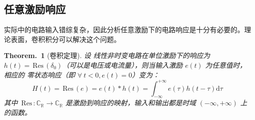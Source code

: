\documentclass[UTF8]{report}
\def\Res{\,\mathrm{Res}\,}
\def\R{\mathbb{R}}
\def\C{\mathbb{C}}
\theoremstyle{MyLineTheoremStyle} %
\theoremstyle{MyBlockTheoremStyle} %
\newtheorem{BlockTheorem}[LineTheorem]{Theorem.\,} %
\theoremstyle{MySubsubsectionStyle} %
\begin{document}
\subsection{任意激励响应}
实际中的电路输入错综复杂，因此分析任意激励下的电路响应是十分有必要的。理论表面，卷积积分可以解决这个问题。

\begin{BlockTheorem}[卷积定理]\label{卷积定理}
设{\color{red} 线性}非时变电路在单位激励下的响应为 $h(t) = \Res(\delta_0)$（可以是电压或电流量），则当输入激励 $e(t)$ 为任意值时，相应的{\color{red} 零状态}响应（即 $\forall\ t < 0, e(t) = 0$）变为：
\begin{equation}
H(t) = \Res(e) = e(t)*h(t) = \int_{-\infty}^{+\infty} e(\tau)h(t - \tau)\mathrm{d}\tau 
\end{equation}
其中 $\Res: \C_{\R} \longrightarrow \C_{\R}$ 是激励到响应的映射，输入和输出都是时域 $(-\infty, +\infty)$ 上的函数。
\end{BlockTheorem}
\end{document}
